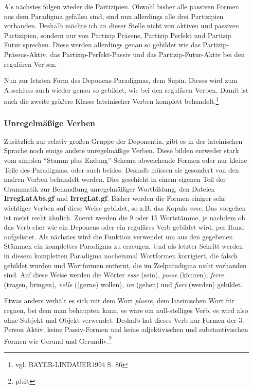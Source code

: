 \documentclass[12pt,abstract=on]{scrreprt}
\begin{document}
Als nächstes folgen wieder die Partizipien. Obwohl bisher alle passiven Formen aus dem Paradigma gefallen sind, sind nun allerdings alle drei Partizipien vorhanden. Deshalb möchte ich an dieser Stelle nicht von aktiven und passiven Partizipien, sondern nur von Partizip Präsens, Partizip Perfekt und Partizip Futur sprechen. Diese werden allerdings genau so gebildet wie das Partizip-Präsens-Aktiv, das Partizip-Perfekt-Passiv und das Partizip-Futur-Aktiv bei den regulären Verben. \par
Nun zur letzten Form des Deponens-Paradigmas, dem Supin. Dieses wird zum Abschluss auch wieder genau so gebildet, wie bei den regulären Verben. Damit ist auch die zweite größere Klasse lateinischer Verben komplett behandelt.\footnote{vgl. BAYER-LINDAUER1994 S. 86} \par
\subsubsection{Unregelmäßige Verben}
Zusätzlich zur relativ großen Gruppe der Deponentia, gibt es in der lateinischen Sprache noch einige andere unregelmäßige Verben. Diese bilden entweder stark vom simplen ``Stamm plus Endung''-Schema abweichende Formen oder nur kleine Teile des Paradigmas, oder auch beides. Deshalb müssen sie gesondert von den andren Verben behandelt werden. Dies geschieht in einem eigenen Teil der Grammatik zur Behandlung unregelmäßiger Wortbildung, den Dateien \textbf{IrregLatAbs.gf} und \textbf{IrregLat.gf}. Bisher werden die Formen einiger sehr wichtiger Verben auf diese Weise gebildet, so z.B. das Kopula \textit{esse}. Das vorgehen ist meist recht ähnlich. Zuerst werden die 9 oder 15 Wortstämme, je nachdem ob das Verb eher wie ein Deponens oder ein reguläres Verb gebildet wird, per Hand aufgelistet. Als nächstes wird die Funktion verwendet um aus den gegebenen Stämmen ein komplettes Paradigma zu erzeugen. Und als letzter Schritt werden in diesem kompletten Paradigma nocheinmal Wortformen korrigiert, die falsch gebildet wurden und Wortformen entfernt, die im Zielparadigma nicht vorhanden sind. Auf diese Weise werden die Wörter \textit{esse} (sein), \textit{posse} (können), \textit{ferre} (tragen, bringen), \textit{velle} ((gerne) wollen), \textit{ire} (gehen) und \textit{fieri} (werden) gebildet. \par
Etwas anders verhält es sich mit dem Wort \textit{pluere}, dem lateinischen Wort für regnen, bei dem man behaupten kann, es wäre ein null-stelliges Verb, es wird also ohne Subjekt und Objekt verwendet. Deshalb hat dieses Verb nur Formen der 3. Person Aktiv, keine Passiv-Formen und keine adjektivischen und substantivischen Formen wie Gerund und Gerundiv.\footnote{pluit}
\end{document}
